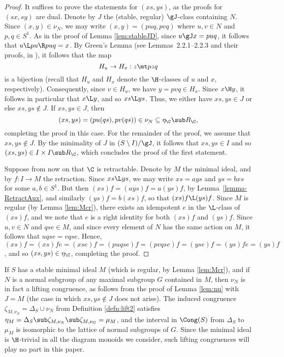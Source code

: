 \begin{proof}
It suffices to prove the statements for $(xs,ys)$, as the proofs for $(sx, sy)$ are dual.  Denote by $J$ the (stable, regular) $\gJ$-class containing $N$.  Since $(x,y)\in\nu_N$, we may write $(x,y)=(puq,pvq)$ where $u,v\in N$ and $p,q\in S^1$.
%
As in the proof of Lemma \ref{lem:stableJD}, since $u\gJ x=puq$, it follows that $u\L pu \R puq=x$.  By Green's Lemma (see Lemmas~2.2.1--2.2.3 and their proofs, in \cite{Howie}), it follows that the map
\[
H_u\to H_x:z\mt pzq
\]
is a bijection (recall that $H_u$ and $H_x$ denote the $\H$-classes of $u$ and $x$, respectively).  Consequently, since $v\in H_u$, we have ${y=pvq\in H_x}$.
%
Since $x\H y$, it follows in particular that $x\L y$, and so $xs\L ys$.  Thus, we either have $xs, ys \in J$ or else $xs, ys\not\in J$.  If $xs,ys\in J$, then
\[
(xs,ys)=(pu(qs),pv(qs))\in\nu_N \subseteq \eta_\C \sub R_{\C},
\]
completing the proof in this case.
%
For the remainder of the proof, we assume that $xs,ys\not\in J$.  By the minimality of $J$ in $(S\setminus I)/{\gJ}$,
it follows that $xs,ys\in I$ and so $(xs, ys)\in I\times I \sub R_{\C}$, which
concludes the proof of the first statement.

Suppose from now on that $\C$ is retractable. Denote by $M$ the minimal ideal, and by $f:I\to M$ the retraction.  Since $xs\L ys$, we may write $xs=ays$ and $ys=bxs$ for some $a,b\in S^1$.  But then $(xs)f=(ays)f=a(ys)f$, by Lemma~\ref{lemma-RetractAux}, and similarly $(ys)f=b(xs)f$, so that $(xs)f\L (ys)f$.  Since $M$ is regular (by Lemma \ref{lem:Mcr}), there exists an idempotent $e$ in the $\L$-class of $(xs)f$, and we note that $e$ is a right identity for both $(xs)f$ and $(ys)f$.  Since $u,v\in N$ and $qse\in M$, and since every element of $N$ has the same action on $M$, it follows that $uqse=vqse$. Hence, $(xs)f=(xs)fe=(xse)f=(puqse)f=(pvqse)f=(yse)f=(ys)fe=(ys)f$, and so $(xs,ys)\in \eta_{\C}$, completing the proof.
\end{proof}

\begin{rem}
If $S$ has a stable minimal ideal $M$ (which is regular, by Lemma \ref{lem:Mcr}), and if $N$ is a normal subgroup of any maximal subgroup $G$ contained in $M$, then $\nu_N$ is in fact a lifting congruence, as follows from the proof of Lemma \ref{lem:nu} with $J=M$ (the case in which $xs,ys\not\in J$ does not arise).  The induced congruence $\zeta_{M,\nu_N}=\Delta_S\cup\nu_N$ from Definition \ref{defn:lift2} satisfies $\eta_M=\Delta_S\sub\zeta_{M,\nu_N}\sub\zeta_{M,\nu_G}=\mu_M$, and the interval in $\Cong(S)$ from $\Delta_S$ to $\mu_M$ is isomorphic to the lattice of normal subgroups of $G$.  Since the minimal ideal is $\H$-trivial in all the diagram monoids we consider, such lifting congruences will play no part in this paper.
\end{rem}

